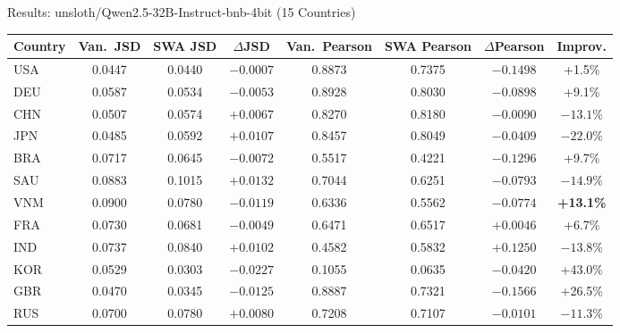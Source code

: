 \documentclass[11pt, aspectratio=169]{beamer}
\begin{document}
\begin{frame}{Results: unsloth/Qwen2.5-32B-Instruct-bnb-4bit (15 Countries)}

\begin{table}
\centering
\scriptsize
\renewcommand{\arraystretch}{1.05}
\begin{tabular}{@{}l cc c cc c c@{}}
\toprule
\textbf{Country} & \textbf{Van.\ JSD} & \textbf{SWA JSD} & \textbf{$\Delta$JSD} & \textbf{Van.\ Pearson} & \textbf{SWA Pearson} & \textbf{$\Delta$Pearson} & \textbf{Improv.} \\
\midrule
USA & 0.0447 & 0.0440 & $-0.0007$ & 0.8873 & 0.7375 & \textcolor{alertred}{$-0.1498$} & \textcolor{cbGreen}{+1.5\%} \\
DEU & 0.0587 & 0.0534 & $-0.0053$ & 0.8928 & 0.8030 & \textcolor{alertred}{$-0.0898$} & \textcolor{cbGreen}{+9.1\%} \\
CHN & 0.0507 & 0.0574 & \textcolor{alertred}{$+0.0067$} & 0.8270 & 0.8180 & \textcolor{alertred}{$-0.0090$} & \textcolor{alertred}{$-13.1\%$} \\
JPN & 0.0485 & 0.0592 & \textcolor{alertred}{$+0.0107$} & 0.8457 & 0.8049 & \textcolor{alertred}{$-0.0409$} & \textcolor{alertred}{$-22.0\%$} \\
BRA & 0.0717 & 0.0645 & $-0.0072$ & 0.5517 & 0.4221 & \textcolor{alertred}{$-0.1296$} & \textcolor{cbGreen}{+9.7\%} \\
SAU & 0.0883 & 0.1015 & \textcolor{alertred}{$+0.0132$} & 0.7044 & 0.6251 & \textcolor{alertred}{$-0.0793$} & \textcolor{alertred}{$-14.9\%$} \\
\rowcolor{lightgray}
VNM & 0.0900 & 0.0780 & $-0.0119$ & 0.6336 & 0.5562 & \textcolor{alertred}{$-0.0774$} & \textcolor{cbGreen}{\textbf{+13.1\%}} \\
FRA & 0.0730 & 0.0681 & $-0.0049$ & 0.6471 & 0.6517 & $+0.0046$ & \textcolor{cbGreen}{+6.7\%} \\
IND & 0.0737 & 0.0840 & \textcolor{alertred}{$+0.0102$} & 0.4582 & 0.5832 & $+0.1250$ & \textcolor{alertred}{$-13.8\%$} \\
KOR & 0.0529 & 0.0303 & $-0.0227$ & 0.1055 & 0.0635 & \textcolor{alertred}{$-0.0420$} & \textcolor{cbGreen}{+43.0\%} \\
GBR & 0.0470 & 0.0345 & $-0.0125$ & 0.8887 & 0.7321 & \textcolor{alertred}{$-0.1566$} & \textcolor{cbGreen}{+26.5\%} \\
RUS & 0.0700 & 0.0780 & \textcolor{alertred}{$+0.0080$} & 0.7208 & 0.7107 & \textcolor{alertred}{$-0.0101$} & \textcolor{alertred}{$-11.3\%$} \\

\end{tabular}
\end{table}
\end{frame}
\end{document}

